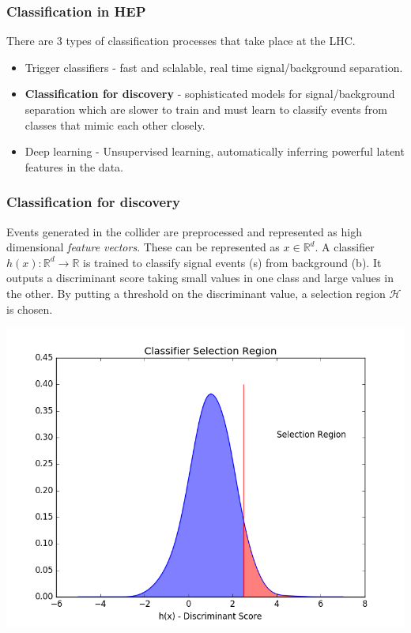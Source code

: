 \documentclass[pdf]{beamer}
\begin{document}
\begin{frame}
\frametitle{Classification in HEP}
There are 3 types of classification processes that take place at the LHC. 
\begin{itemize}
\item<1->Trigger classifiers - fast and sclalable, real time signal/background separation. 
\item<2->  \textbf{Classification for discovery} - sophisticated models for signal/background separation which are slower to train and must learn to classify events from classes that mimic each other closely.  
\item<3-> Deep learning - Unsupervised learning, automatically inferring powerful latent features in the data. 
\end{itemize}

\end{frame}

\begin{frame}
\frametitle{Classification for discovery} 
Events generated in the collider are preprocessed and represented 
as high dimensional \textit{feature  vectors}. These can be represented as $ x \in \mathbb{R}^{d}$. 
A classifier $h(x): \mathbb{R}^d \rightarrow \mathbb{R}$ is trained to classify signal events (s) from background (b). It outputs a discriminant score taking small values in one class and large values in the other. By putting a threshold on the discriminant value, a selection region $\mathcal{H}$ is chosen.
\begin{center}
\includegraphics[scale=0.30]{selection_region.png}
\end{center}
\end{frame}
\end{document}
